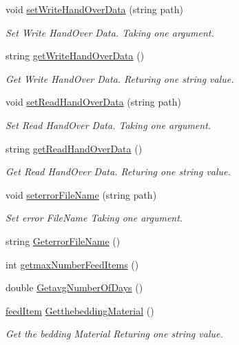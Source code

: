 \begin{DoxyCompactItemize}
void \mbox{\hyperlink{class_global_vars_aa0e41152bee501f128dc362540652326}{set\+Write\+Hand\+Over\+Data}} (string path)
\begin{DoxyCompactList}\small\item\em Set Write Hand\+Over Data. Taking one argument. \end{DoxyCompactList}\item 
string \mbox{\hyperlink{class_global_vars_aba6cb8dacca6e4db1f77c504027e38a7}{get\+Write\+Hand\+Over\+Data}} ()
\begin{DoxyCompactList}\small\item\em Get Write Hand\+Over Data. Returing one string value. \end{DoxyCompactList}\item 
void \mbox{\hyperlink{class_global_vars_a3d2a46ab9111e91ec5d7108f3b6bb949}{set\+Read\+Hand\+Over\+Data}} (string path)
\begin{DoxyCompactList}\small\item\em Set Read Hand\+Over Data. Taking one argument. \end{DoxyCompactList}\item 
string \mbox{\hyperlink{class_global_vars_a0989d5988f75ed2be0993c16cb3397be}{get\+Read\+Hand\+Over\+Data}} ()
\begin{DoxyCompactList}\small\item\em Get Read Hand\+Over Data. Returing one string value. \end{DoxyCompactList}\item 
void \mbox{\hyperlink{class_global_vars_ace9170eba61644f40c5689d021e7ac8b}{seterror\+File\+Name}} (string path)
\begin{DoxyCompactList}\small\item\em Set error File\+Name Taking one argument. \end{DoxyCompactList}\item 
string \mbox{\hyperlink{class_global_vars_a513057b3afb410a82e48170fde7f19aa}{Geterror\+File\+Name}} ()
\item 
int \mbox{\hyperlink{class_global_vars_a76458db4b5f2b97dd8fe01f2a5a73f87}{getmax\+Number\+Feed\+Items}} ()
\item 
double \mbox{\hyperlink{class_global_vars_a1d152c67721fc4d265fd737adcbac6db}{Getavg\+Number\+Of\+Days}} ()
\item 
\mbox{\hyperlink{classfeed_item}{feed\+Item}} \mbox{\hyperlink{class_global_vars_a94dc7347c7b4fc213dc302d321b33b9e}{Getthebedding\+Material}} ()
\begin{DoxyCompactList}\small\item\em Get the bedding Material Returing one string value. \end{DoxyCompactList}\item 

\end{DoxyCompactItemize}
